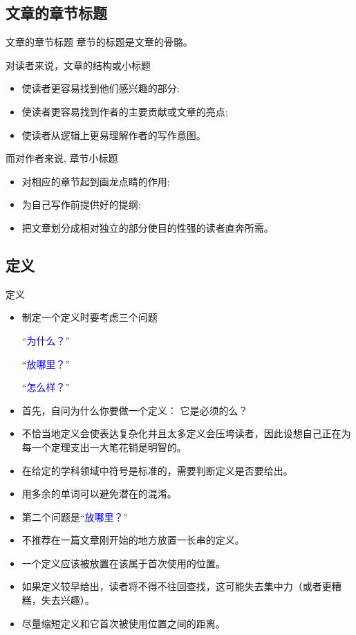 \documentclass[13pt]{ctexbeamer}
\newcommand{\blue}[1]{\textcolor{blue}{#1}}
\begin{document}
\subsection{文章的章节标题}
\begin{frame}{文章的章节标题}
章节的标题是文章的骨骼。

对读者来说，文章的结构或小标题

\begin{itemize}
    \item  使读者更容易找到他们感兴趣的部分;
\item 使读者更容易找到作者的主要贡献或文章的亮点;
\item 使读者从逻辑上更易理解作者的写作意图。
\end{itemize}


而对作者来说, 章节小标题
\begin{itemize}
    \item  对相应的章节起到画龙点睛的作用;

\item 为自己写作前提供好的提纲;

\item 把文章划分成相对独立的部分使目的性强的读者直奔所需。
\end{itemize}
\end{frame}




\subsection{定义}
\begin{frame}{定义}
	\begin{itemize}
		\item
		制定一个定义时要考虑三个问题

		``\blue{为什么？}''

		``\blue{放哪里？}''

		``\blue{怎么样？}''
		\item
		首先，自问为什么你要做一个定义： 它是必须的么？
		\item
		不恰当地定义会使表达复杂化并且太多定义会压垮读者，因此设想自己正在为每一个定理支出一大笔花销是明智的。
		\item
		在给定的学科领域中符号是标准的，需要判断定义是否要给出。
		\item
		用多余的单词可以避免潜在的混淆。
	\end{itemize}
\end{frame}


\begin{frame}
	\begin{itemize}
		\item  第二个问题是``\blue{放哪里？}''
		\item 不推荐在一篇文章刚开始的地方放置一长串的定义。
		\item  一个定义应该被放置在该属于首次使用的位置。
		\item 如果定义较早给出，读者将不得不往回查找，这可能失去集中力（或者更糟糕，失去兴趣）。
		\item 尽量缩短定义和它首次被使用位置之间的距离。
	\end{itemize}
\end{frame}
\end{document}
